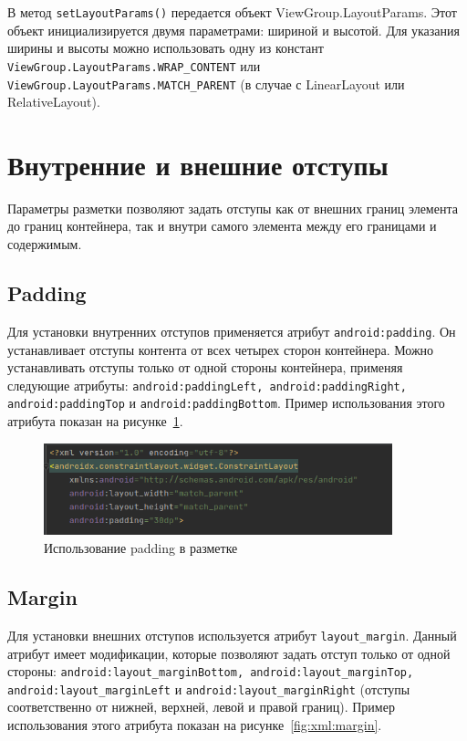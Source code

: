 В метод \texttt{setLayoutParams()} передается объект ViewGroup.LayoutParams.
Этот объект инициализируется двумя параметрами: шириной и высотой.
Для указания ширины и высоты можно использовать одну из констант
\texttt{ViewGroup.LayoutParams.WRAP\_CONTENT} или
\texttt{ViewGroup.LayoutParams.MATCH\_PARENT} (в случае с LinearLayout или
RelativeLayout).

\section{Внутренние и внешние отступы}
Параметры разметки позволяют задать отступы как от внешних границ
элемента до границ контейнера, так и внутри самого элемента между его
границами и содержимым.

\subsection{Padding}
Для установки внутренних отступов применяется атрибут
\texttt{android:padding}. Он устанавливает отступы контента от всех четырех
сторон контейнера. Можно устанавливать отступы только от одной стороны
контейнера, применяя следующие атрибуты:
\texttt{android:paddingLeft, android:paddingRight,
android:paddingTop} и \texttt{android:paddingBottom}.
Пример использования этого атрибута показан на рисунке~\ref{fig:xml:padding}.

\begin{figure}[h!tp]
	\centering
	\includegraphics[width=0.9\textwidth]{Screenshot from 2023-03-10 13-01-54.png}
	\caption{Использование padding в разметке}
	\label{fig:xml:padding}
\end{figure}

\subsection{Margin}
Для установки внешних отступов используется атрибут \texttt{layout\_margin}.
Данный атрибут имеет модификации, которые позволяют задать отступ
только от одной стороны: \texttt{android:layout\_marginBottom,
android:layout\_marginTop, android:layout\_marginLeft} и
\texttt{android:layout\_marginRight} (отступы соответственно от нижней,
верхней, левой и правой границ).
Пример использования этого атрибута показан на рисунке~\ref{fig:xml:margin}.

